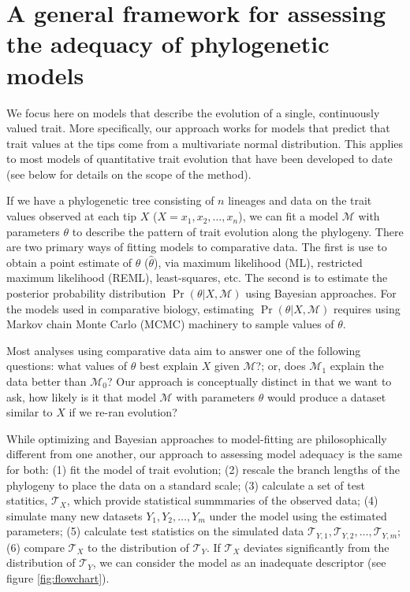 \section{A general framework for assessing the adequacy of phylogenetic models}

We focus here on models that describe the evolution of a single, continuously valued trait. More specifically, our approach works for models that predict that trait values at the tips come from a multivariate normal distribution. This applies to most models of quantitative trait evolution that have been developed to date (see below for details on the scope of the method).

If we have a phylogenetic tree consisting of $n$ lineages and data on the trait values observed at each tip $X$ ($X=x_1, x_2, \ldots, x_n$), we can fit a model $\mathcal{M}$ with parameters $\theta$ to describe the pattern of trait evolution along the phylogeny. There are two primary ways of fitting models to comparative data. The first is use to obtain a point estimate of $\theta$ ($\hat \theta$), via maximum likelihood (ML), restricted maximum likelihood (REML), least-squares, etc. The second is to estimate the posterior probability distribution $\Pr(\theta|X, \mathcal{M})$ using Bayesian approaches.
For the models used in comparative biology, estimating $\Pr(\theta|X, \mathcal{M})$ requires using Markov chain Monte Carlo (MCMC) machinery to sample values of $\theta$.

Most analyses using comparative data aim to answer one of the following questions: what values of $\theta$ best explain $X$ given $\mathcal{M}$?; or, does $\mathcal{M}_1$ explain the data better than $\mathcal{M}_0$? 
Our approach is conceptually distinct in that we want to ask, how likely is it that model $\mathcal{M}$ with parameters $\theta$ would produce a dataset similar to $X$ if we re-ran evolution?   

While optimizing and Bayesian approaches to model-fitting are philosophically different from one another, our approach to assessing model adequacy is the same for both: (1) fit the model of trait evolution; (2) rescale the branch lengths of the phylogeny to place the data on a standard scale; (3) calculate a set of test statitics, $\mathcal{T}_X$, which provide statistical summmaries of the observed data; (4) simulate many new datasets $Y_1, Y_2, \ldots, Y_m$ under the model using the estimated parameters; (5) calculate test statistics on the simulated data $\mathcal{T}_{Y,1}, \mathcal{T}_{Y,2}, \ldots, \mathcal{T}_{Y,m}$; (6) compare $\mathcal{T}_X$ to the distribution of $\mathcal{T}_Y$. If $\mathcal{T}_X$ deviates significantly from the distribution of $\mathcal{T}_Y$, we can consider the model as an inadequate descriptor (see figure \ref{fig:flowchart}).

